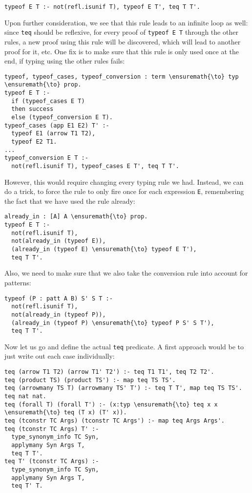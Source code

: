 \begin{verbatim}
typeof E T :- not(refl.isunif T), typeof E T', teq T T'.
\end{verbatim}

Upon further consideration, we see that this rule leads to an infinite
loop as well: since \texttt{teq} should be reflexive, for every proof of
\texttt{typeof\ E\ T\textquotesingle{}} through the other rules, a new
proof using this rule will be discovered, which will lead to another
proof for it, etc. One fix is to make sure that this rule is only used
once at the end, if typing using the other rules fails:

\begin{verbatim}
typeof, typeof_cases, typeof_conversion : term \ensuremath{\to} typ \ensuremath{\to} prop.
typeof E T :-
  if (typeof_cases E T)
  then success
  else (typeof_conversion E T).
typeof_cases (app E1 E2) T' :-
  typeof E1 (arrow T1 T2),
  typeof E2 T1.
...
typeof_conversion E T :-
  not(refl.isunif T), typeof_cases E T', teq T T'.
\end{verbatim}

However, this would require changing every typing rule we had. Instead,
we can do a trick, to force the rule to only fire once for each
expression \texttt{E}, remembering the fact that we have used the rule
already:

\begin{verbatim}
already_in : [A] A \ensuremath{\to} prop.
typeof E T :-
  not(refl.isunif T),
  not(already_in (typeof E)),
  (already_in (typeof E) \ensuremath{\to} typeof E T'),
  teq T T'.
\end{verbatim}

Also, we need to make sure that we also take the conversion rule into
account for patterns:

\begin{verbatim}
typeof (P : patt A B) S' S T :-
  not(refl.isunif T),
  not(already_in (typeof P)),
  (already_in (typeof P) \ensuremath{\to} typeof P S' S T'),
  teq T T'.
\end{verbatim}

Now let us go and define the actual \texttt{teq} predicate. A first
approach would be to just write out each case individually:

\begin{verbatim}
teq (arrow T1 T2) (arrow T1' T2') :- teq T1 T1', teq T2 T2'.
teq (product TS) (product TS') :- map teq TS TS'.
teq (arrowmany TS T) (arrowmany TS' T') :- teq T T', map teq TS TS'.
teq nat nat.
teq (forall T) (forall T') :- (x:typ \ensuremath{\to} teq x x \ensuremath{\to} teq (T x) (T' x)).
teq (tconstr TC Args) (tconstr TC Args') :- map teq Args Args'.
teq (tconstr TC Args) T' :-
  type_synonym_info TC Syn,
  applymany Syn Args T,
  teq T T'.
teq T' (tconstr TC Args) :-
  type_synonym_info TC Syn,
  applymany Syn Args T,
  teq T' T.
\end{verbatim}

